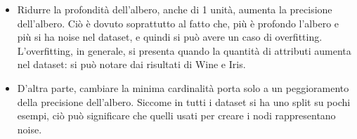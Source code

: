 \documentclass{article}
\begin{document}
\begin{itemize}
	\item Ridurre la profondità dell'albero, anche di 1 unità, aumenta la precisione dell'albero. Ciò è dovuto soprattutto al fatto che, più è profondo l'albero e più si ha noise nel dataset, e quindi si può avere un caso di overfitting. L'overfitting, in generale, si presenta quando la quantità di attributi aumenta nel dataset: si può notare dai risultati di Wine e Iris.
	\item D'altra parte, cambiare la minima cardinalità porta solo a un peggioramento della precisione dell'albero. Siccome in tutti i dataset si ha uno split su pochi esempi, ciò può significare che quelli usati per creare i nodi rappresentano noise.
\end{itemize}
\end{document}
